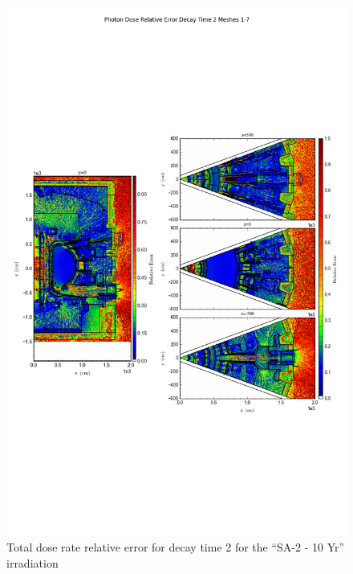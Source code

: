 \documentclass[12pt]{article}
\begin{document}
\begin{figure}[ht!]
\centering
\includegraphics[trim={0cm 8cm, 0cm 8cm},clip,scale=0.75]{../plots/final_model_with_b4c/5year/Photon_Dose_Relative_Error_Decay_Time_2_Meshes_1-7.png}
\caption{Total dose rate relative error for decay time 2 for the ``SA-2 - 10 Yr'' irradiation}
\label{fig:photons_5y_dc2_b4c_relerr}
\end{figure}
\clearpage
\end{document}
